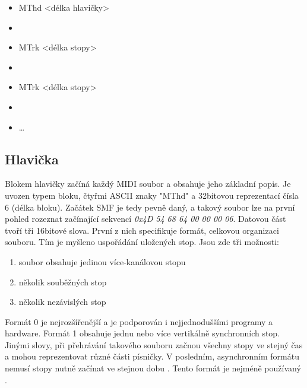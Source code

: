 \begin{itemize} [label={}]
    \item MThd <délka hlavičky>
    \item <data hlavičky>
    \item MTrk <délka stopy>
    \item <data stopy>
    \item MTrk <délka stopy>
    \item <data stopy>
    \item \dots
\end{itemize}

\subsection{Hlavička}
Blokem hlavičky začíná každý MIDI soubor a obsahuje jeho základní popis.
Je uvozen typem bloku, čtyřmi ASCII znaky "MThd" 
a 32bitovou reprezentací čísla 6 (délka bloku). 
Začátek SMF je tedy pevně daný, 
a takový soubor lze na první pohled rozeznat začínající sekvencí 
\emph{0x4D 54 68 64 00 00 00 06}. 
Datovou část tvoří tři 16bitové slova.
První z nich specifikuje formát, celkovou organizaci souboru.
Tím je myšleno uspořádání uložených stop.
Jsou zde tři možnosti:

\begin{enumerate}\addtocounter{enumi}{-1}
    \item soubor obsahuje jedinou více-kanálovou stopu
    \item několik souběžných stop
    \item několik nezávislých stop
\end{enumerate}

Formát 0 je nejrozšířenější a je podporován i nejjednoduššími programy 
a hardware.
\cite{Back_SMF_Specif}
Formát 1 obsahuje jednu nebo více vertikálně synchronních stop.
Jinými slovy, při přehrávání takového souboru 
začnou všechny stopy ve stejný čas 
a mohou reprezentovat různé části písničky.
V posledním, asynchronním formátu nemusí stopy nutně začínat ve stejnou dobu
\cite{Neznamy_aboutMIDIFiles}.
Tento formát je nejméně používaný
\cite{MIDI_tutorials}.
\par

